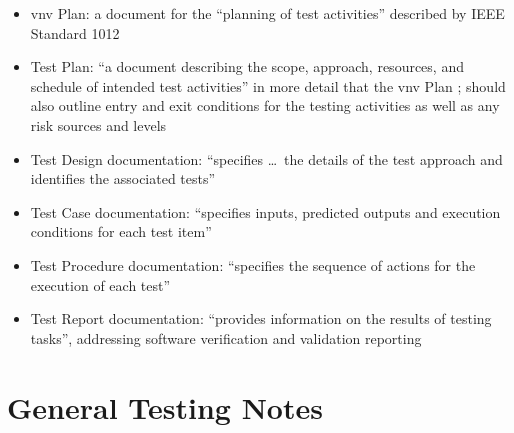 \begin{itemize}
      \item \acf{vnv} Plan: a document for the ``planning of test activities''
            described by IEEE Standard 1012 \citep[p.~411]{vanVliet2000}
      \item Test Plan: ``a document describing the scope, approach, resources,
            and schedule of intended test activities'' in more detail that the
            \acs{vnv} Plan \citep[pp.~412-413]{vanVliet2000};
            should also outline entry and exit conditions for the testing
            activities as well as any risk sources and levels
            \citep[p.~445]{PetersAndPedrycz2000}
      \item Test Design documentation: ``specifies \dots\ the details of the
            test approach and identifies the associated tests''
            \citep[p.~413]{vanVliet2000}
      \item Test Case documentation: ``specifies inputs, predicted outputs and
            execution conditions for each test item''
            \citep[p.~413]{vanVliet2000}
      \item Test Procedure documentation: ``specifies the sequence of actions
            for the execution of each test'' \citep[p.~413]{vanVliet2000}
      \item Test Report documentation: ``provides information on the results of
            testing tasks'', addressing software verification and validation
            reporting \citep[p.~413]{vanVliet2000}
\end{itemize}

\section{General Testing Notes}

